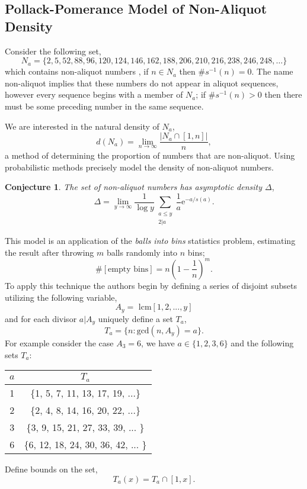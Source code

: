 \documentclass{article}
\theoremstyle{definition}
\newtheorem{conjecture}{Conjecture}[section]
\begin{document}
\subsection{Pollack-Pomerance Model of Non-Aliquot Density}
Consider the following set,
$$N_a = \{2,5,52,88,96,120,124,146,162,188,206,210,216,238,246,248, \dots\}$$
which contains non-aliquot numbers \cite{sloane_2022}, if $n \in N_a$ then $\#s^{-1}(n) = 0$. The name non-aliquot implies that these numbers do not appear in aliquot sequences, however every sequence begins with a member of $N_a$; if $\#s^{-1}(n) > 0$ then there must be some preceding number in the same sequence.

We are interested in the natural density of $N_a$,
$$d(N_a) = \lim_{n \to \infty}\frac{|N_a \cap[1,n]|}{n},$$
a method of determining the proportion of numbers that are non-aliquot. Using probabilistic methods \cite{pollPom} precisely model the density of non-aliquot numbers.
\begin{conjecture}{\textit{The set of non-aliquot numbers has asymptotic density $\Delta$},}
    $$\Delta = \lim_{y \to \infty}\frac{1}{\log y} \sum_{\substack{a\leq y \\ 2 | a}} \frac{1}{a}\text{e}^{-a/s(a)}.$$
\end{conjecture}

This model is an application of the \textit{balls into bins} statistics problem, estimating the result after throwing $m$ balls randomly into $n$ bins;
$$\#[\text{empty bins}] = n(1- \frac{1}{n})^m.$$
To apply this technique the authors begin by defining a series of disjoint subsets utilizing the following variable,
$$A_y = \text{ lcm}[1, 2, ..., y]$$
and for each divisor $a | A_y$ uniquely define a set $T_a$,
$$T_a = \{n : \text{gcd}(n, A_y) = a\}.$$
For example consider the case $A_3 = 6$, we have $a \in \{1,2,3,6\}$ and the following sets $T_a$:
\begin{center}
    \begin{tabular}{ |c|c|}
        \hline
        $a$ & $T_a$                               \\
        \hline
        1   & \{1, 5, 7, 11, 13, 17, 19, ...\}    \\
        \hline
        2   & \{2, 4, 8, 14, 16, 20, 22, ...\}    \\
        \hline
        3   & \{3, 9, 15, 21, 27, 33, 39, ...  \} \\
        \hline
        6   & \{6, 12, 18, 24, 30, 36, 42, ... \} \\
        \hline
    \end{tabular}
\end{center}
Define bounds on the set,
$$T_a(x) = T_a \cap [1,x].$$
\end{document}
